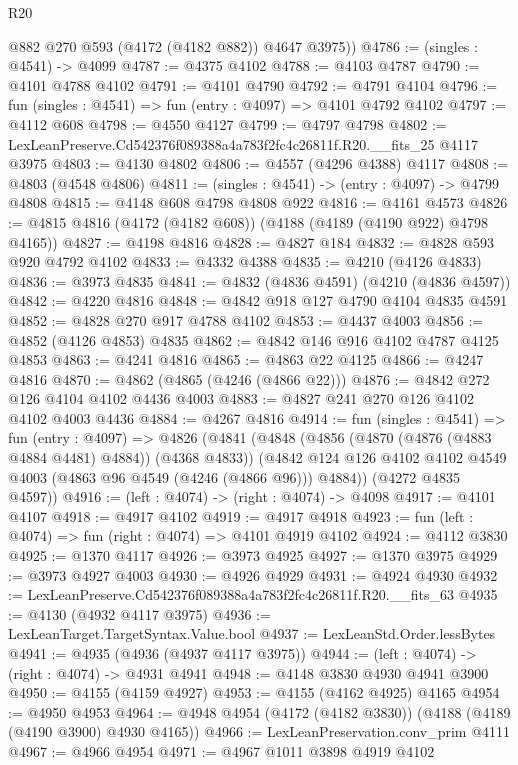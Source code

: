 \begin{lexlean}{R20}
\begin{coremodule}
        @882
        @270
        @593
        (@4172 (@4182 @882))
        @4647
        @3975))
@4786 := (singles : @4541) -> @4099
@4787 := @4375 @4102
@4788 := @4103 @4787
@4790 := @4101 @4788 @4102
@4791 := @4101 @4790
@4792 := @4791 @4104
@4796 := fun (singles : @4541) => fun (entry : @4097) => @4101 @4792 @4102
@4797 := @4112 @608
@4798 := @4550 @4127
@4799 := @4797 @4798
@4802 := LexLeanPreserve.Cd542376f089388a4a783f2fc4c26811f.R20.__fits_25 @4117 @3975
@4803 := @4130 @4802
@4806 := @4557 (@4296 @4388) @4117
@4808 := @4803 (@4548 @4806)
@4811 := (singles : @4541) -> (entry : @4097) -> @4799 @4808
@4815 := @4148 @608 @4798 @4808 @922
@4816 := @4161 @4573
@4826 := @4815 @4816 (@4172 (@4182 @608)) (@4188 (@4189 (@4190 @922) @4798 @4165))
@4827 := @4198 @4816
@4828 := @4827 @184
@4832 := @4828 @593 @920 @4792 @4102
@4833 := @4332 @4388
@4835 := @4210 (@4126 @4833)
@4836 := @3973 @4835
@4841 := @4832 (@4836 @4591) (@4210 (@4836 @4597))
@4842 := @4220 @4816
@4848 := @4842 @918 @127 @4790 @4104 @4835 @4591
@4852 := @4828 @270 @917 @4788 @4102
@4853 := @4437 @4003
@4856 := @4852 (@4126 @4853) @4835
@4862 := @4842 @146 @916 @4102 @4787 @4125 @4853
@4863 := @4241 @4816
@4865 := @4863 @22 @4125
@4866 := @4247 @4816
@4870 := @4862 (@4865 (@4246 (@4866 @22)))
@4876 := @4842 @272 @126 @4104 @4102 @4436 @4003
@4883 := @4827 @241 @270 @126 @4102 @4102 @4003 @4436
@4884 := @4267 @4816
@4914 := fun (singles : @4541) =>
  fun (entry : @4097) =>
  @4826
    (@4841
      (@4848
        (@4856 (@4870 (@4876 (@4883 @4884 @4481) @4884)) (@4368 @4833))
        (@4842 @124 @126 @4102 @4102 @4549 @4003 (@4863 @96 @4549 (@4246 (@4866 @96))) @4884))
      (@4272 @4835 @4597))
@4916 := (left : @4074) -> (right : @4074) -> @4098
@4917 := @4101 @4107
@4918 := @4917 @4102
@4919 := @4917 @4918
@4923 := fun (left : @4074) => fun (right : @4074) => @4101 @4919 @4102
@4924 := @4112 @3830
@4925 := @1370 @4117
@4926 := @3973 @4925
@4927 := @1370 @3975
@4929 := @3973 @4927 @4003
@4930 := @4926 @4929
@4931 := @4924 @4930
@4932 := LexLeanPreserve.Cd542376f089388a4a783f2fc4c26811f.R20.__fits_63
@4935 := @4130 (@4932 @4117 @3975)
@4936 := LexLeanTarget.TargetSyntax.Value.bool
@4937 := LexLeanStd.Order.lessBytes
@4941 := @4935 (@4936 (@4937 @4117 @3975))
@4944 := (left : @4074) -> (right : @4074) -> @4931 @4941
@4948 := @4148 @3830 @4930 @4941 @3900
@4950 := @4155 (@4159 @4927)
@4953 := @4155 (@4162 @4925) @4165
@4954 := @4950 @4953
@4964 := @4948 @4954 (@4172 (@4182 @3830)) (@4188 (@4189 (@4190 @3900) @4930 @4165))
@4966 := LexLeanPreservation.conv_prim @4111
@4967 := @4966 @4954
@4971 := @4967 @1011 @3898 @4919 @4102

\end{coremodule}
\end{lexlean}
